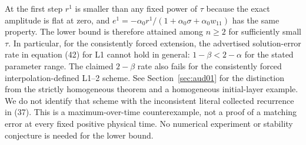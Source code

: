 \documentclass[11pt,a4paper]{amsart}
\theoremstyle{remark}
\theoremstyle{plain}
\theoremstyle{remark}
\numberwithin{equation}{section}
\begin{document}
At the first step $r^1$ is smaller than any fixed power of $\tau$ because the exact amplitude is flat at zero, and $e^1=-\alpha_0 r^1/(1+\alpha_0\sigma+\alpha_0w_{11})$ has the same property. The lower bound is therefore attained among $n\ge2$ for sufficiently small $\tau$. In particular, for the consistently forced extension, the advertised solution-error rate in equation (42) for L1 cannot hold in general: $1-\beta<2-\alpha$ for the stated parameter range. The claimed $2-\beta$ rate also fails for the consistently forced interpolation-defined L1--2 scheme. See Section~\ref{sec:aud01} for the distinction from the strictly homogeneous theorem and a homogeneous initial-layer example. We do not identify that scheme with the inconsistent literal collected recurrence in (37). This is a maximum-over-time counterexample, not a proof of a matching error at every fixed positive physical time. No numerical experiment or stability conjecture is needed for the lower bound.
\end{document}
